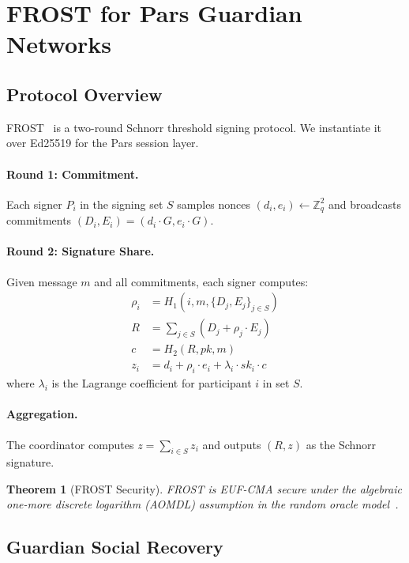 \documentclass[11pt,a4paper]{article}
\newtheorem{theorem}{Theorem}[section]
\begin{document}
\section{FROST for Pars Guardian Networks}
\label{sec:frost}

\subsection{Protocol Overview}

FROST~\cite{komlo2020frost} is a two-round Schnorr threshold signing
protocol.  We instantiate it over Ed25519 for the Pars session layer.

\paragraph{Round 1: Commitment.}
Each signer $P_i$ in the signing set $S$ samples nonces
$(d_i, e_i) \leftarrow \mathbb{Z}_q^2$ and broadcasts commitments
$(D_i, E_i) = (d_i \cdot G, e_i \cdot G)$.

\paragraph{Round 2: Signature Share.}
Given message $m$ and all commitments, each signer computes:
\begin{align}
    \rho_i &= H_1(i, m, \{D_j, E_j\}_{j \in S}) \\
    R &= \sum_{j \in S} (D_j + \rho_j \cdot E_j) \\
    c &= H_2(R, pk, m) \\
    z_i &= d_i + \rho_i \cdot e_i + \lambda_i \cdot sk_i \cdot c
\end{align}
where $\lambda_i$ is the Lagrange coefficient for participant $i$ in
set $S$.

\paragraph{Aggregation.}
The coordinator computes $z = \sum_{i \in S} z_i$ and outputs
$(R, z)$ as the Schnorr signature.

\begin{theorem}[FROST Security]
    FROST is EUF-CMA secure under the algebraic one-more discrete
    logarithm (AOMDL) assumption in the random oracle
    model~\cite{komlo2020frost}.
\end{theorem}

\subsection{Guardian Social Recovery}
\end{document}
